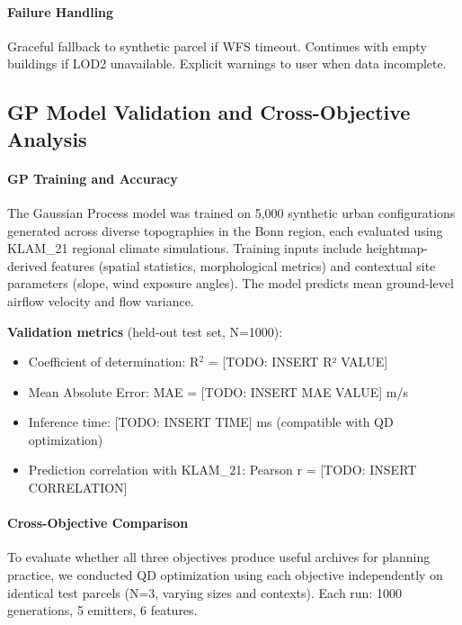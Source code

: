 \documentclass[times,final]{elsarticle}
\begin{document}
\paragraph{Failure Handling}
Graceful fallback to synthetic parcel if WFS timeout. Continues with empty buildings if LOD2 unavailable. Explicit warnings to user when data incomplete.

\subsection{GP Model Validation and Cross-Objective Analysis}
\label{sec:gp_validation}

\paragraph{GP Training and Accuracy}
The Gaussian Process model was trained on 5,000 synthetic urban configurations generated across diverse topographies in the Bonn region, each evaluated using KLAM\_21 regional climate simulations. Training inputs include heightmap-derived features (spatial statistics, morphological metrics) and contextual site parameters (slope, wind exposure angles). The model predicts mean ground-level airflow velocity and flow variance.

\textbf{Validation metrics} (held-out test set, N=1000):
\begin{itemize}
\item Coefficient of determination: R$^2$ = [TODO: INSERT R² VALUE]
\item Mean Absolute Error: MAE = [TODO: INSERT MAE VALUE] m/s
\item Inference time: [TODO: INSERT TIME] ms (compatible with QD optimization)
\item Prediction correlation with KLAM\_21: Pearson r = [TODO: INSERT CORRELATION]
\end{itemize}


\paragraph{Cross-Objective Comparison}
To evaluate whether all three objectives produce useful archives for planning practice, we conducted QD optimization using each objective independently on identical test parcels (N=3, varying sizes and contexts). Each run: 1000 generations, 5 emitters, 6 features.
\end{document}
